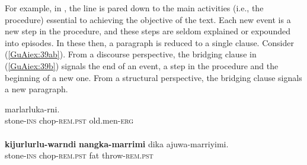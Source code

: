 \documentclass[output=paper]{LSP/langsci}
\begin{document}
For example, in , the  line is pared down to the main activities (i.e., the procedure) essential to achieving the objective of the text. Each new event is a new step in the procedure, and these steps are seldom explained or expounded into episodes. In these  then, a paragraph is reduced to a single clause. Consider (\ref{GuAiex:39ab}). From a discourse perspective, the bridging clause in (\ref{GuAiex:39b}) signals the end of an event, a step in the procedure and the beginning of a new one. From a structural perspective, the bridging clause signals a new paragraph.

\pagebreak
\begin{exe}
\ex \label{GuAiex:39ab}
\begin{xlist}
\ex \label{GuAiex:39a}
\gll \underline{}   \underline{}     marlarluka-rni.\\
stone-\textsc{ins}     chop-\textsc{rem.pst}     old.men-\textsc{erg}\\
\glt {} \\
\ex \label{GuAiex:39b}
\gll \textbf{kijurlurlu-warndi}   \textbf{nangka-marrimi}  dika   ajuwa-marriyimi. \\
stone-\textsc{ins}     chop-\textsc{rem.pst}    fat   throw-\textsc{rem.pst} \\
\glt {}
\end{xlist}
\end{exe}
\end{document}
